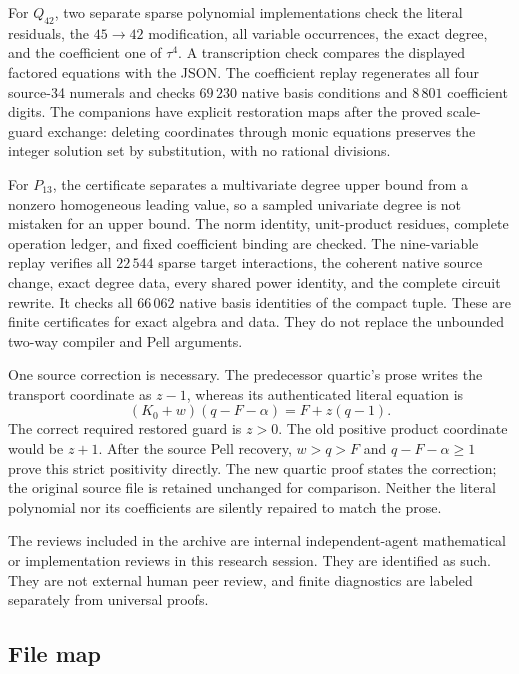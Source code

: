 \documentclass[11pt,a4paper]{article}
\numberwithin{equation}{section}
\begin{document}
For $Q_{42}$, two separate sparse polynomial implementations check the
literal residuals, the $45\to42$ modification, all variable occurrences,
the exact degree, and the coefficient one of $\tau^4$. A transcription
check compares the displayed factored equations with the JSON. The
coefficient replay regenerates all four source-34 numerals and checks
$69\,230$ native basis conditions and $8\,801$ coefficient digits. The
companions have explicit restoration maps after the proved scale-guard
exchange: deleting coordinates through
monic equations preserves the integer solution set by substitution, with
no rational divisions.

For $P_{13}$, the certificate separates a multivariate degree upper bound
from a nonzero homogeneous leading value, so a sampled univariate degree
is not mistaken for an upper bound. The norm identity, unit-product
residues, complete operation ledger, and fixed coefficient binding are
checked. The nine-variable replay verifies all $22\,544$ sparse target
interactions, the coherent native source change, exact degree data,
every shared power identity, and the complete circuit rewrite. It checks
all $66\,062$ native basis identities of the compact tuple. These are
finite certificates for exact algebra and data. They do not replace the
unbounded two-way compiler and Pell arguments.

One source correction is necessary. The predecessor quartic's prose
writes the transport coordinate as $z-1$, whereas its authenticated
literal equation is
\[
 (K_0+w)(q-F-\alpha)=F+z(q-1).
\]
The correct required restored guard is $z>0$. The old positive product
coordinate would be $z+1$. After the source Pell recovery,
$w>q>F$ and $q-F-\alpha\ge1$ prove this strict positivity directly.
The new quartic proof states the correction; the original source file is
retained unchanged for comparison. Neither the literal polynomial nor
its coefficients are silently repaired to match the prose.

The reviews included in the archive are internal independent-agent
mathematical or implementation reviews in this research session. They
are identified as such. They are not external human peer review, and
finite diagnostics are labeled separately from universal proofs.

\subsection{File map}
\end{document}
